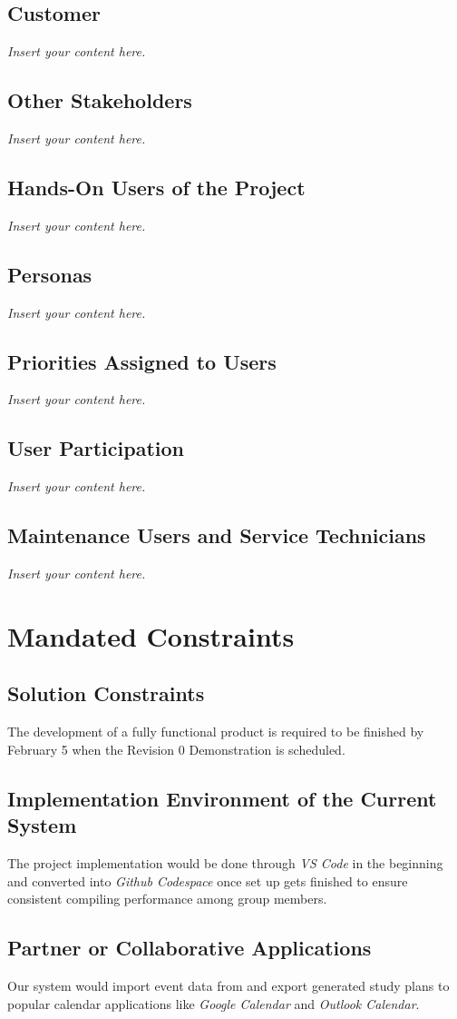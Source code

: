 \documentclass[12pt]{article}
\newcommand{\lips}{\textit{Insert your content here.}}
\begin{document}
\subsection{Customer}
\lips
\subsection{Other Stakeholders}
\lips
\subsection{Hands-On Users of the Project}
\lips
\subsection{Personas}
\lips
\subsection{Priorities Assigned to Users}
\lips
\subsection{User Participation}
\lips
\subsection{Maintenance Users and Service Technicians}
\lips

\section{Mandated Constraints}
\subsection{Solution Constraints}
The development of a fully functional product is required to be finished by February 5 when the Revision 0 Demonstration is scheduled.
\subsection{Implementation Environment of the Current System}
The project implementation would be done through \textit{VS Code} in the beginning and converted into \textit{Github Codespace} once set up gets finished to ensure consistent compiling performance among group members.
\subsection{Partner or Collaborative Applications}
Our system would import event data from and export generated study plans to popular calendar applications like \textit{Google Calendar} and \textit{Outlook Calendar}. 
\end{document}
